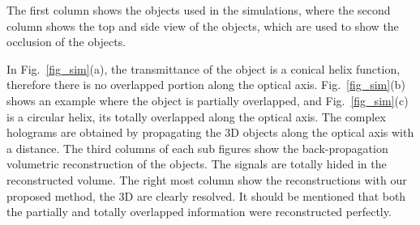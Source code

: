 \documentclass[9pt,twocolumn,twoside]{osajnl}
\begin{document}
The first column shows the objects used in the simulations, where the second column shows the top and side view of the objects, which are used to show the occlusion of the objects.

In Fig.~\ref{fig_sim}(a), the transmittance of the object is a conical helix function, therefore there is no overlapped portion along the optical axis. 
Fig.~\ref{fig_sim}(b) shows an example where the object is partially overlapped,
and Fig.~\ref{fig_sim}(c) is a circular helix, its totally overlapped along the optical axis.
The complex holograms are obtained by propagating the 3D objects along the optical axis with a distance. 
The third columns of each sub figures show the back-propagation volumetric reconstruction of the objects. The signals are totally hided in the reconstructed volume. 
The right most column show the reconstructions with our proposed method, the 3D are clearly resolved. It should be mentioned that both the partially and totally overlapped information were reconstructed perfectly.
\end{document}
